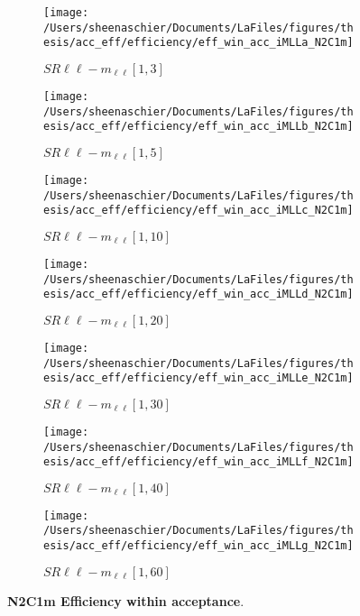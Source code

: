 \begin{figure}
        \centering
    \begin{subfigure}[b]{0.44\textwidth}
        \texttt{[image: /Users/sheenaschier/Documents/LaFiles/figures/thesis/acc\_eff/efficiency/eff\_win\_acc\_iMLLa\_N2C1m]}
    \caption{$SR\ell\ell-m_{\ell\ell} [1, 3]$}
    \end{subfigure}
    \begin{subfigure}[b]{0.44\textwidth}
        \texttt{[image: /Users/sheenaschier/Documents/LaFiles/figures/thesis/acc\_eff/efficiency/eff\_win\_acc\_iMLLb\_N2C1m]}
    \caption{$SR\ell\ell-m_{\ell\ell} [1, 5]$}
    \end{subfigure}
    \begin{subfigure}[b]{0.44\textwidth}
        \texttt{[image: /Users/sheenaschier/Documents/LaFiles/figures/thesis/acc\_eff/efficiency/eff\_win\_acc\_iMLLc\_N2C1m]}
    \caption{$SR\ell\ell-m_{\ell\ell} [1, 10]$}
    \end{subfigure}
    \begin{subfigure}[b]{0.44\textwidth}
        \texttt{[image: /Users/sheenaschier/Documents/LaFiles/figures/thesis/acc\_eff/efficiency/eff\_win\_acc\_iMLLd\_N2C1m]}
    \caption{$SR\ell\ell-m_{\ell\ell} [1, 20]$}
    \end{subfigure}
    \begin{subfigure}[b]{0.44\textwidth}
        \texttt{[image: /Users/sheenaschier/Documents/LaFiles/figures/thesis/acc\_eff/efficiency/eff\_win\_acc\_iMLLe\_N2C1m]}
    \caption{$SR\ell\ell-m_{\ell\ell} [1, 30]$}
    \end{subfigure}
    \begin{subfigure}[b]{0.44\textwidth}
        \texttt{[image: /Users/sheenaschier/Documents/LaFiles/figures/thesis/acc\_eff/efficiency/eff\_win\_acc\_iMLLf\_N2C1m]}
    \caption{$SR\ell\ell-m_{\ell\ell} [1, 40]$}
    \end{subfigure}
    \begin{subfigure}[b]{0.44\textwidth}
        \texttt{[image: /Users/sheenaschier/Documents/LaFiles/figures/thesis/acc\_eff/efficiency/eff\_win\_acc\_iMLLg\_N2C1m]}
    \caption{$SR\ell\ell-m_{\ell\ell} [1, 60]$}
    \end{subfigure}
    \caption{\textbf{N2C1m Efficiency within acceptance}.}
\end{figure}


